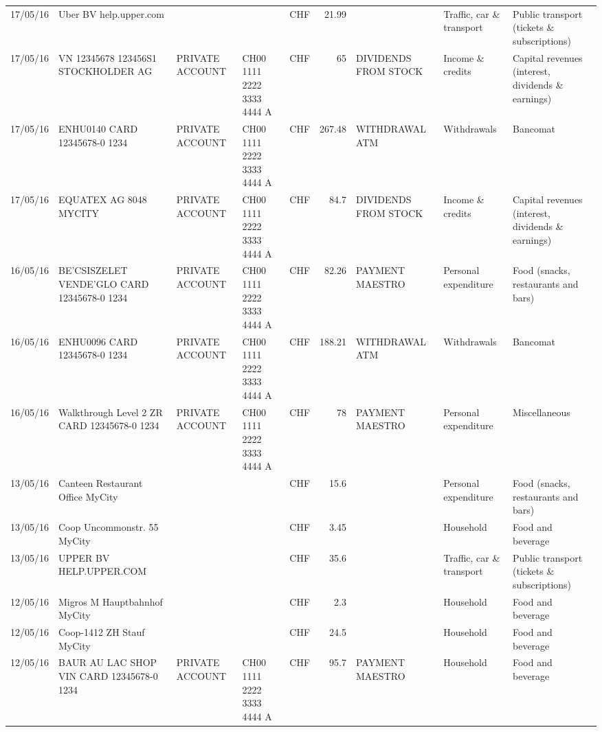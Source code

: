 \begin{landscape}
\begin{table}[h]
\begin{center}
\begin{tabular}{rllllrlll}
		17/05/16 & Uber BV                  help.upper.com &       &       & CHF   & 21.99 &       & Traffic, car \& transport & Public transport (tickets \& subscriptions) \\
		17/05/16 & VN 12345678     123456S1 STOCKHOLDER AG & PRIVATE ACCOUNT & CH00 1111 2222 3333 4444 A & CHF   & 65    & DIVIDENDS FROM STOCK & Income \& credits & Capital revenues (interest, dividends \& earnings) \\
		17/05/16 & ENHU0140 CARD 12345678-0 1234 & PRIVATE ACCOUNT & CH00 1111 2222 3333 4444 A & CHF   & 267.48 & WITHDRAWAL ATM & Withdrawals & Bancomat \\
		17/05/16 & EQUATEX AG 8048 MYCITY & PRIVATE ACCOUNT & CH00 1111 2222 3333 4444 A & CHF   & 84.7  & DIVIDENDS FROM STOCK & Income \& credits & Capital revenues (interest, dividends \& earnings) \\
		16/05/16 & BE'CSISZELET VENDE'GLO CARD 12345678-0 1234 & PRIVATE ACCOUNT & CH00 1111 2222 3333 4444 A & CHF   & 82.26 & PAYMENT MAESTRO & Personal expenditure & Food (snacks, restaurants and bars) \\
		16/05/16 & ENHU0096 CARD 12345678-0 1234 & PRIVATE ACCOUNT & CH00 1111 2222 3333 4444 A & CHF   & 188.21 & WITHDRAWAL ATM & Withdrawals & Bancomat \\
		16/05/16 & Walkthrough Level 2 ZR CARD 12345678-0 1234 & PRIVATE ACCOUNT & CH00 1111 2222 3333 4444 A & CHF   & 78    & PAYMENT MAESTRO & Personal expenditure & Miscellaneous \\
		13/05/16 & Canteen Restaurant Office      MyCity &       &       & CHF   & 15.6  &       & Personal expenditure & Food (snacks, restaurants and bars) \\
		13/05/16 & Coop Uncommonstr. 55   MyCity &       &       & CHF   & 3.45  &       & Household & Food and beverage \\
		13/05/16 & UPPER BV                  HELP.UPPER.COM &       &       & CHF   & 35.6  &       & Traffic, car \& transport & Public transport (tickets \& subscriptions) \\
		12/05/16 & Migros M Hauptbahnhof    MyCity &       &       & CHF   & 2.3   &       & Household & Food and beverage \\
		12/05/16 & Coop-1412 ZH Stauf       MyCity &       &       & CHF   & 24.5  &       & Household & Food and beverage \\
		12/05/16 & BAUR AU LAC SHOP VIN CARD 12345678-0 1234 & PRIVATE ACCOUNT & CH00 1111 2222 3333 4444 A & CHF   & 95.7  & PAYMENT MAESTRO & Household & Food and beverage \\

\end{tabular}
\end{center}
\end{table}
\end{landscape}
